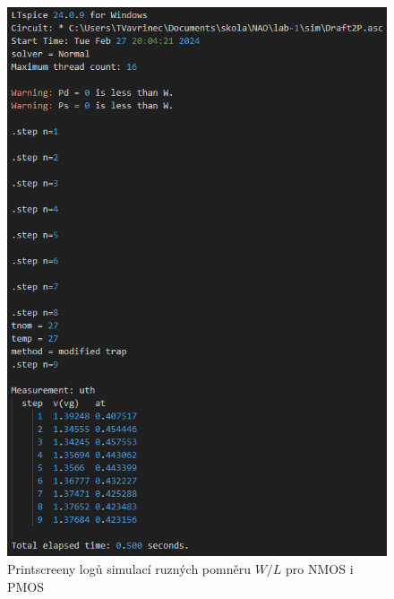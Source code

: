 \begin{figure}[H]
\begin{minipage}{0.5\textwidth}
        \includegraphics[height=0.4\textheight]{log/P-UTH00-WL_dinamic.png}
    \end{minipage}
    \caption{\label{fig:log_NP_WL_const} Printscreeny logů simulací ruzných pomněru \(W/L\) pro NMOS i PMOS}
\end{figure}


